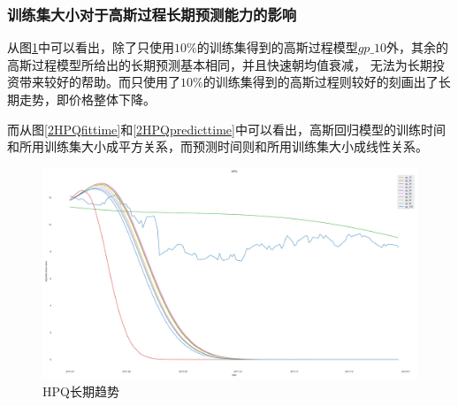 \subsubsection{训练集大小对于高斯过程长期预测能力的影响}

从图\ref{2lab2HPQtrend}中可以看出，除了只使用$10\%$的训练集得到的高斯过程模型$gp\_10$外，其余的高斯过程模型所给出的长期预测基本相同，并且快速朝均值衰减，
无法为长期投资带来较好的帮助。而只使用了$10\%$的训练集得到的高斯过程则较好的刻画出了长期走势，即价格整体下降。

而从图\ref{2HPQfittime}和\ref{2HPQpredicttime}中可以看出，高斯回归模型的训练时间和所用训练集大小成平方关系，而预测时间则和所用训练集大小成线性关系。

\begin{figure}[!htbp]
    \centering
    \includegraphics[width=\textwidth]{images/lab2/HPQ_trend.png}
    \caption{HPQ长期趋势}\label{2lab2HPQtrend}
\end{figure}


